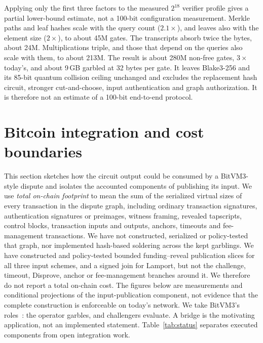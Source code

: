 \documentclass[11pt]{article}
\begin{document}
Applying only the first three factors to the measured $2^{18}$ verifier profile
gives a partial lower-bound estimate, not a 100-bit configuration measurement.
Merkle paths and leaf hashes scale with the query count ($2.1\times$), and leaves
also with the element size ($2\times$), to about 45M gates. The transcripts
absorb twice the bytes, about 24M. Multiplications triple, and those that depend
on the queries also scale with them, to about 213M. The result is about 280M
non-free gates, $3\times$ today's, and about 9\,GB garbled at 32 bytes per gate.
It leaves Blake3-256 and its 85-bit quantum collision ceiling unchanged and
excludes the replacement hash circuit, stronger cut-and-choose, input
authentication and graph authorization. It is therefore not an estimate of a
100-bit end-to-end protocol.

\section{Bitcoin integration and cost boundaries}\label{sec:protocol}

This section sketches how the circuit output could be consumed by a
BitVM3-style dispute and isolates the accounted components of publishing its
input. We use \emph{total on-chain footprint} to mean the sum of the serialized
virtual sizes of every transaction in the dispute graph, including ordinary
transaction signatures, authentication signatures or preimages, witness
framing, revealed tapscripts, control blocks, transaction inputs and outputs,
anchors, timeouts and fee-management transactions. We have not constructed,
serialized or policy-tested that graph, nor implemented hash-based soldering
across the kept garblings. We have constructed and policy-tested bounded
funding--reveal publication slices for all three input schemes, and a signed
join for Lamport, but not the challenge, timeout,
Disprove, anchor or fee-management branches around it. We therefore do not
report a total on-chain cost. The figures below are measurements and
conditional projections of the input-publication component, not evidence
that the complete construction is enforceable on today's network. We take BitVM3's
roles~\cite{bitvm3paper,mosaic26}: the operator garbles, and challengers
evaluate. A bridge is the motivating application, not an implemented statement.
Table~\ref{tab:status} separates executed components from open integration work.
\end{document}
